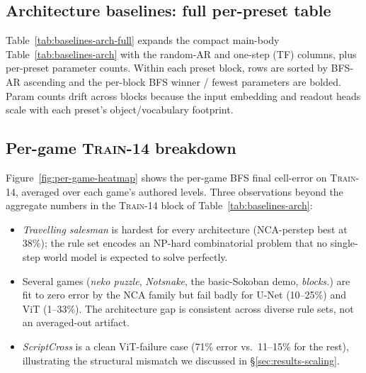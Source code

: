 \subsection{Architecture baselines: full per-preset table}
\label{app:baselines-full}

Table~\ref{tab:baselines-arch-full} expands the compact main-body
Table~\ref{tab:baselines-arch} with the random-AR and one-step (TF)
columns, plus per-preset parameter counts. Within each preset block,
rows are sorted by BFS-AR ascending and the per-block BFS winner /
fewest parameters are bolded. Param counts drift across blocks
because the input embedding and readout heads scale with each
preset's object/vocabulary footprint.

\begin{table}[t]
  \centering
  \caption{\textbf{Architecture baselines across three corpora ---
    full version.} Mean $\pm$ std over 3 seeds. All three error
    columns are per-cell, averaged across rollout steps and
    aggregated across games/levels; lower is better.}
  \label{tab:baselines-arch-full}
  \small
  \resizebox{\linewidth}{!}{%
  }
\end{table}

\subsection{Per-game \textsc{Train-14} breakdown}
\label{app:per-game}

Figure~\ref{fig:per-game-heatmap} shows the per-game BFS final
cell-error on \textsc{Train-14}, averaged over each game's authored
levels. Three observations beyond the aggregate numbers in the
\textsc{Train-14} block of Table~\ref{tab:baselines-arch}:

\begin{itemize}
  \item \textit{Travelling salesman} is hardest for every architecture
    (NCA-perstep best at 38\%); the rule set encodes an NP-hard
    combinatorial problem that no single-step world model is
    expected to solve perfectly.
  \item Several games (\textit{neko puzzle}, \textit{Notsnake}, the
    basic-Sokoban demo, \textit{blocks.}) are fit to zero error by the
    NCA family but fail badly for U-Net (10--25\%) and ViT (1--33\%).
    The architecture gap is consistent across diverse rule sets, not
    an averaged-out artifact.
  \item \textit{ScriptCross} is a clean ViT-failure case (71\% error
    vs.\ 11--15\% for the rest), illustrating the structural
    mismatch we discussed in \S\ref{sec:results-scaling}.
\end{itemize}


